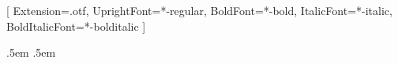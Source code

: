 \usepackage{amsmath,amsthm}
\usepackage{tikz}

\usepackage{fontspec,unicode-math}
\setmainfont{texgyrepagella}[
  Extension=.otf,
  UprightFont=*-regular,
  BoldFont=*-bold,
  ItalicFont=*-italic,
  BoldItalicFont=*-bolditalic
]

\setlength{\textwidth}{390pt}
\setlength{\oddsidemargin}{\dimexpr(\paperwidth-\textwidth)/2-1in\relax}
\setlength{\evensidemargin}{\oddsidemargin}
\setlength{\emergencystretch}{3em}


\makeatletter
\renewcommand{\@openbib@code}{%
  \setlength{\itemindent}{\leftmargin}%
  \setlength{\leftmargin}{0pt}%
}
\makeatother

\newcommand{\MM}{\overline{\mathcal{M}}}
\newcommand{\EE}{\mathbb{E}}
\newcommand{\dd}{\mathrm{d}}

\DeclareMathOperator{\Cin}{\mathrm{Cin}}

  {\topsep}{\topsep}{\itshape}{}{\bfseries}{}{.5em}
  {}
  {\topsep}{\topsep}{\normalfont}{}{\bfseries}{}{.5em}
  {}

\theoremstyle{paperplain}
\newtheorem{thm}{Theorem}[section]
\newtheorem{dfn}[thm]{Definition}
\newtheorem{lmm}[thm]{Lemma}
\newtheorem{prp}[thm]{Proposition}
\newtheorem{crl}[thm]{Corollary}

\theoremstyle{paperremark}
\newtheorem{rmk}{Remark}[section]
\newtheorem{exm}{Example}[section]
\theoremstyle{paperplain}

\newenvironment{prf}{\noindent \textbf{Proof: }}{\hfill $\mdlgwhtsquare$}
\newenvironment{prfn}[1]{\vskip 1em \noindent \textbf{Proof of #1: }}{\hfill $\mdlgwhtsquare$}
